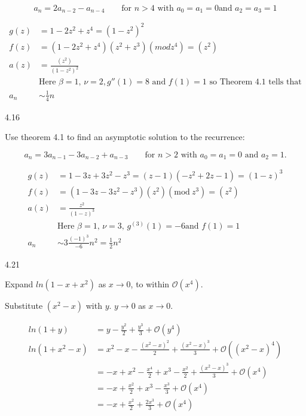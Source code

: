 \documentclass[12pt]{article}
\begin{document}
\[
a_n = 2a_{n - 2} - a_{n - 4} \qquad \text{for $n > 4$ with $a_0 = a_1 = 0$
    and $a_2 = a_3 = 1$}
\]

\[
\begin{split}
g(z) & = 1 - 2z^2 + z^4 = (1 - z^2)^2 \\
f(z) & = (1 - 2z^2 + z^4)(z^2 + z^3)(mod z^4) = (z^2) \\
a(z) & = \frac{(z^2)}{(1 - z^2)^2}\\
& \text{Here $\beta = 1$, $\nu = 2, g''(1) = 8$ and $f(1) = 1$ so Theorem 4.1 tells that} \\
a_n & \sim \frac{1}{4}n
\end{split}
\]

4.16

Use theorem 4.1 to find an asymptotic solution to the recurrence:

\[
a_n = 3a_{n - 1} - 3a_{n - 2} + a_{n - 3} \qquad
\text{for $n > 2$ with $a_0 = a_1 = 0$ and $a_2 = 1$.}
\]

\[
\begin{split}
g(z) & = 1 - 3z + 3z^2 - z^3 = (z - 1)(-z^2 + 2z - 1) = (1 - z)^3 \\
f(z) & = (1 - 3z - 3z^2 - z^3)(z^2)(\text{mod}\ z^3) = (z^2) \\
a(z) & = \frac{z^2}{(1 - z)^3} \\
& \text{Here $\beta = 1$, $\nu = 3$, $g^{(3)}(1) = -6$
    and $f(1) = 1$}\\
a_n & \sim 3\frac{(-1)^3}{-6}n^2 = \frac{1}{2}n^2
\end{split}
\]

4.21

Expand $ln(1 - x + x^2)$ as $x \rightarrow 0$, to within $\mathcal{O}(x^4)$.

Substitute $(x^2 - x)$ with $y$. $y \rightarrow 0$ as $x \rightarrow 0$.

\[
\begin{split}
ln(1 + y) & = y - \frac{y^2}{2} + \frac{y^3}{3} + \mathcal{O}(y^4) \\
ln(1 + x^2 - x) & = x^2 - x - \frac{(x^2 - x)^2}{2} + \frac{(x^2 - x)^3}{3} +
    \mathcal{O}((x^2 - x)^4) \\
    & = -x + x^2 - \frac{x^4}{2} + x^3 - \frac{x^2}{2} + \frac{(x^2 - x)^3}{3} +
    \mathcal{O}(x^4) \\
    & = -x + \frac{x^2}{2} + x^3 - \frac{x^3}{3} + \mathcal{O}(x^4) \\
    & = -x + \frac{x^2}{2} + \frac{2x^3}{3} + \mathcal{O}(x^4)
\end{split}
\]
\end{document}
